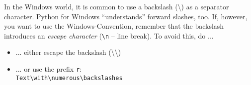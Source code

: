 \begin{frame}
%
\begin{hintbox}
In the Windows world, it is common to use a backslash (\textbackslash) as a separator character. Python for Windows \enquote{understands} forward slashes, too. If, however, you want to use the Windows-Convention, remember that the backslash introduces an \emph{escape character} (\eg \texttt{\textbackslash n} -- line break). To avoid this, do ...

\vspace{12pt}
\begin{itemize}
\item ... either escape the backslash (\textbackslash\textbackslash)
\item ... or use the prefix \texttt{r}: \\
	\thus \texttt{Text\textbackslash with\textbackslash numerous\textbackslash backslashes}
\end{itemize}
\end{hintbox}
%
\end{frame}


